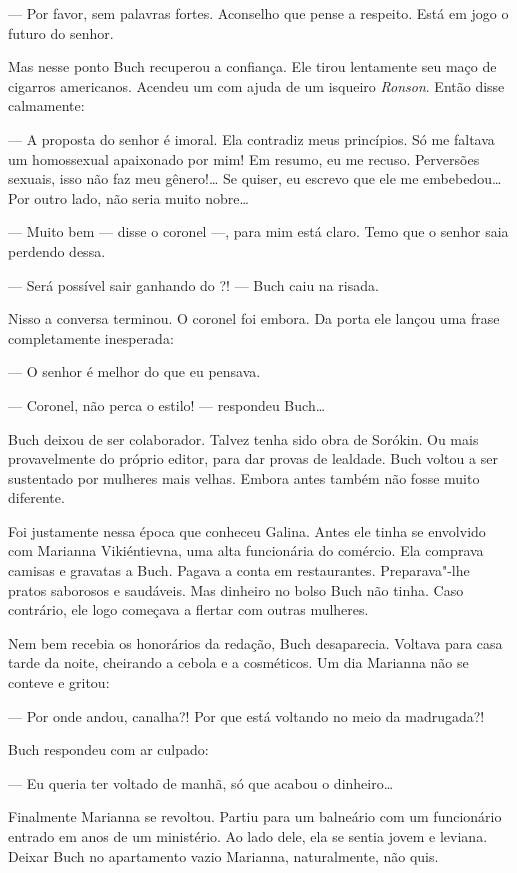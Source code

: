 --- Por favor, sem palavras fortes. Aconselho que pense a respeito. Está
em jogo o futuro do senhor.

Mas nesse ponto Buch recuperou a confiança. Ele tirou lentamente seu
maço de cigarros americanos. Acendeu um com ajuda de um isqueiro
\emph{Ronson}. Então disse calmamente:

--- A proposta do senhor é imoral. Ela contradiz meus princípios. Só me
faltava um homossexual apaixonado por mim! Em resumo, eu me recuso.
Perversões sexuais, isso não faz meu gênero!\ldots{} Se quiser, eu escrevo
que ele me embebedou\ldots{} Por outro lado, não seria muito nobre\ldots{}

--- Muito bem --- disse o coronel ---, para mim está claro. Temo que o
senhor saia perdendo dessa.

--- Será possível sair ganhando do ?! --- Buch caiu na risada.

Nisso a conversa terminou. O coronel foi embora. Da porta ele lançou uma
frase completamente inesperada:

--- O senhor é melhor do que eu pensava.

--- Coronel, não perca o estilo! --- respondeu Buch\ldots{}

Buch deixou de ser colaborador. Talvez tenha sido obra de Sorókin. Ou
mais provavelmente do próprio editor, para dar provas de lealdade. Buch
voltou a ser sustentado por mulheres mais velhas. Embora antes também
não fosse muito diferente.

Foi justamente nessa época que conheceu Galina. Antes ele tinha se
envolvido com Marianna Vikiéntievna, uma alta funcionária do comércio.
Ela comprava camisas e gravatas a Buch. Pagava a conta em restaurantes.
Preparava"-lhe pratos saborosos e saudáveis. Mas dinheiro no bolso Buch
não tinha. Caso contrário, ele logo começava a flertar com outras
mulheres.

Nem bem recebia os honorários da redação, Buch desaparecia. Voltava para
casa tarde da noite, cheirando a cebola e a cosméticos. Um dia Marianna
não se conteve e gritou:

--- Por onde andou, canalha?! Por que está voltando no meio da
madrugada?!

Buch respondeu com ar culpado:

--- Eu queria ter voltado de manhã, só que acabou o dinheiro\ldots{}

Finalmente Marianna se revoltou. Partiu para um balneário com um
funcionário entrado em anos de um ministério. Ao lado dele, ela se
sentia jovem e leviana. Deixar Buch no apartamento vazio Marianna,
naturalmente, não quis.

